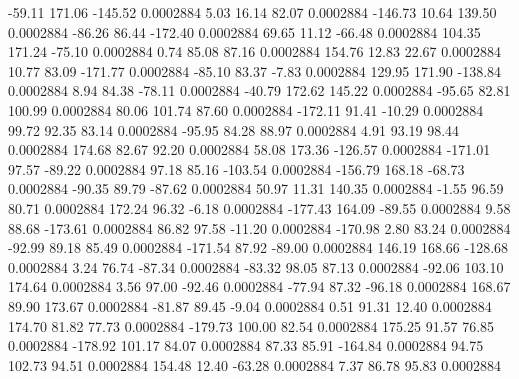       -59.11      171.06     -145.52     0.0002884
        5.03       16.14       82.07     0.0002884
     -146.73       10.64      139.50     0.0002884
      -86.26       86.44     -172.40     0.0002884
       69.65       11.12      -66.48     0.0002884
      104.35      171.24      -75.10     0.0002884
        0.74       85.08       87.16     0.0002884
      154.76       12.83       22.67     0.0002884
       10.77       83.09     -171.77     0.0002884
      -85.10       83.37       -7.83     0.0002884
      129.95      171.90     -138.84     0.0002884
        8.94       84.38      -78.11     0.0002884
      -40.79      172.62      145.22     0.0002884
      -95.65       82.81      100.99     0.0002884
       80.06      101.74       87.60     0.0002884
     -172.11       91.41      -10.29     0.0002884
       99.72       92.35       83.14     0.0002884
      -95.95       84.28       88.97     0.0002884
        4.91       93.19       98.44     0.0002884
      174.68       82.67       92.20     0.0002884
       58.08      173.36     -126.57     0.0002884
     -171.01       97.57      -89.22     0.0002884
       97.18       85.16     -103.54     0.0002884
     -156.79      168.18      -68.73     0.0002884
      -90.35       89.79      -87.62     0.0002884
       50.97       11.31      140.35     0.0002884
       -1.55       96.59       80.71     0.0002884
      172.24       96.32       -6.18     0.0002884
     -177.43      164.09      -89.55     0.0002884
        9.58       88.68     -173.61     0.0002884
       86.82       97.58      -11.20     0.0002884
     -170.98        2.80       83.24     0.0002884
      -92.99       89.18       85.49     0.0002884
     -171.54       87.92      -89.00     0.0002884
      146.19      168.66     -128.68     0.0002884
        3.24       76.74      -87.34     0.0002884
      -83.32       98.05       87.13     0.0002884
      -92.06      103.10      174.64     0.0002884
        3.56       97.00      -92.46     0.0002884
      -77.94       87.32      -96.18     0.0002884
      168.67       89.90      173.67     0.0002884
      -81.87       89.45       -9.04     0.0002884
        0.51       91.31       12.40     0.0002884
      174.70       81.82       77.73     0.0002884
     -179.73      100.00       82.54     0.0002884
      175.25       91.57       76.85     0.0002884
     -178.92      101.17       84.07     0.0002884
       87.33       85.91     -164.84     0.0002884
       94.75      102.73       94.51     0.0002884
      154.48       12.40      -63.28     0.0002884
        7.37       86.78       95.83     0.0002884
